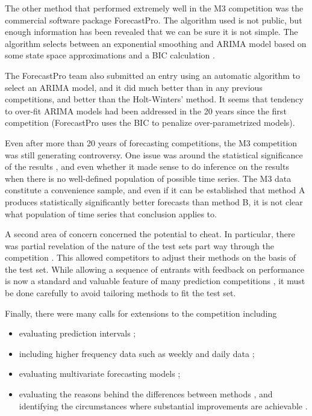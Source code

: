 \documentclass[11pt,a4paper,]{article}
\providecommand{\tightlist}{%
  \setlength{\itemsep}{0pt}\setlength{\parskip}{0pt}}
\begin{document}
The other method that performed extremely well in the M3 competition was the commercial software package ForecastPro. The algorithm used is not public, but enough information has been revealed that we can be sure it is not simple. The algorithm selects between an exponential smoothing and ARIMA model based on some state space approximations and a BIC calculation \autocite{Goodrich2000}.

The ForecastPro team also submitted an entry using an automatic algorithm to select an ARIMA model, and it did much better than in any previous competitions, and better than the Holt-Winters' method. It seems that tendency to over-fit ARIMA models had been addressed in the 20 years since the first competition (ForecastPro uses the BIC to penalize over-parametrized models).

Even after more than 20 years of forecasting competitions, the M3 competition was still generating controversy. One issue was around the statistical significance of the results \autocite{Stekler01}, and even whether it made sense to do inference on the results when there is no well-defined population of possible time series. The M3 data constitute a convenience sample, and even if it can be established that method A produces statistically significantly better forecasts than method B, it is not clear what population of time series that conclusion applies to.

A second area of concern concerned the potential to cheat. In particular, there was partial revelation of the nature of the test sets part way through the competition \autocite{Goodrich2001}. This allowed competitors to adjust their methods on the basis of the test set. While allowing a sequence of entrants with feedback on performance is now a standard and valuable feature of many prediction competitions \autocite{AH11}, it must be done carefully to avoid tailoring methods to fit the test set.

Finally, there were many calls for extensions to the competition including

\begin{itemize}
\tightlist
\item
  evaluating prediction intervals \autocite{Goodrich2001};
\item
  including higher frequency data such as weekly and daily data \autocite{Goodrich2001};
\item
  evaluating multivariate forecasting models \autocite{Granger2001};
\item
  evaluating the reasons behind the differences between methods \autocite{Hyndman2001}, and identifying the circumstances where substantial improvements are achievable \autocite{Fildes2001}.
\end{itemize}
\end{document}

